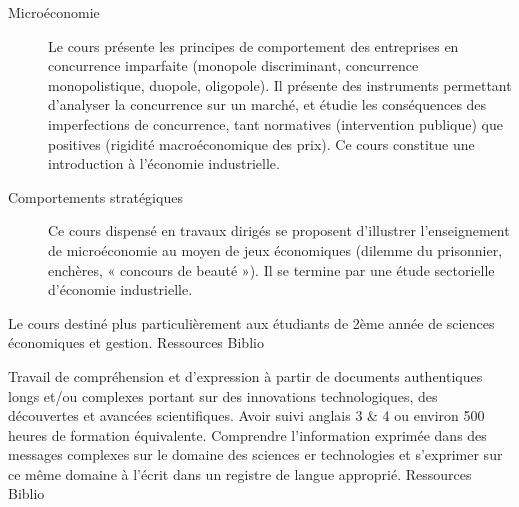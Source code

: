 \documentclass[10pt, a5paper]{report}
\begin{document}
{
\begin{description}
\item[Microéconomie] Le cours présente les principes de comportement des entreprises en concurrence imparfaite (monopole discriminant, concurrence monopolistique, duopole, oligopole). Il présente des instruments permettant d'analyser la concurrence sur un marché, et étudie les conséquences des imperfections de concurrence, tant normatives (intervention publique) que positives (rigidité macroéconomique des prix). Ce cours constitue une introduction à l'économie industrielle.
\item[Comportements stratégiques] Ce cours dispensé en travaux dirigés se proposent d'illustrer l'enseignement de microéconomie au moyen de jeux économiques (dilemme du prisonnier, enchères, « concours de beauté »). Il se termine par une étude sectorielle d'économie industrielle.
\end{description}
}
{Le cours destiné plus particulièrement aux étudiants de 2ème année de sciences économiques et gestion.}
{} 
{Ressources} 
{Biblio} 
 
\vfill


{
Travail de compréhension et d'expression à partir de documents authentiques longs et/ou complexes portant sur des innovations technologiques, des découvertes et avancées scientifiques.
}
{Avoir suivi anglais 3 \& 4 ou environ 500 heures de formation équivalente.}
{Comprendre l'information exprimée dans des messages complexes sur le domaine des sciences  er technologies et s'exprimer sur ce même domaine à l'écrit dans un registre de langue approprié.}
{Ressources} 
{Biblio} 
 
\end{document}

